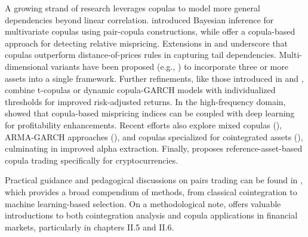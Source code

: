 A growing strand of research leverages copulas to model more general dependencies beyond linear correlation.
\cite{Min2010} introduced Bayesian inference for multivariate copulas using pair-copula constructions, while \cite{stander2013trading} offer a copula-based approach for detecting relative mispricing. 
Extensions in \cite{Liew2013} and \cite{Xie2016} underscore that copulas outperform distance-of-prices rules in capturing tail dependencies.
Multi-dimensional variants have been proposed (e.g., \cite{lau2016multi}) to incorporate three or more assets into a single framework. Further refinements, like those introduced in \cite{Krauss2017} and \cite{zhi2017dynamic}, combine t-copulas or dynamic copula-GARCH models with individualized thresholds for improved risk-adjusted returns. In the high-frequency domain, \cite{Chu2018} showed that copula-based mispricing indices can be coupled with deep learning for profitability enhancements. Recent efforts also explore mixed copulas (\cite{SabinodaSilva2023}), ARMA-GARCH approaches (\cite{Wang2023}), and copulas specialized for cointegrated assets (\cite{He2024}), culminating in improved alpha extraction. Finally, \cite{Tadi2025} proposes reference-asset-based copula trading specifically for cryptocurrencies. 
%

Practical guidance and pedagogical discussions on pairs trading can be found in \cite{hudsonthames2024}, which provides a broad compendium of methods, from classical cointegration to machine learning-based selection. On a methodological note, \cite{alexander2008market} offers valuable introductions to both cointegration analysis and copula applications in financial markets, particularly in chapters II.5 and II.6.


